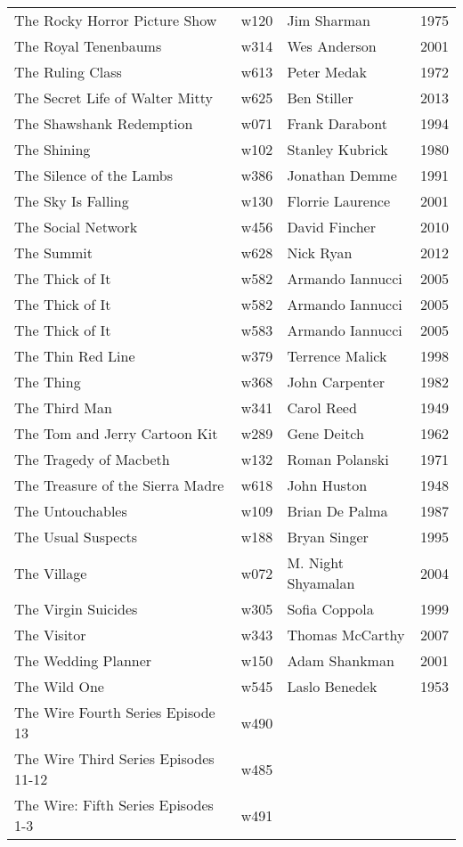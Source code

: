 \documentclass{article}
\begin{document}
\begin {center}
\begin{longtable}{p{10cm} l l l}
The Rocky Horror Picture Show & w120 & Jim Sharman & 1975 \\
The Royal Tenenbaums & w314 & Wes Anderson & 2001 \\
The Ruling Class & w613 & Peter Medak & 1972 \\
The Secret Life of Walter Mitty & w625 & Ben Stiller & 2013 \\
The Shawshank Redemption & w071 & Frank Darabont & 1994 \\
The Shining & w102 & Stanley Kubrick & 1980 \\
The Silence of the Lambs & w386 & Jonathan Demme & 1991 \\
The Sky Is Falling & w130 & Florrie Laurence & 2001 \\
The Social Network & w456 & David Fincher & 2010 \\
The Summit & w628 & Nick Ryan & 2012 \\
The Thick of It & w582 & Armando Iannucci & 2005 \\
The Thick of It & w582 & Armando Iannucci & 2005 \\
The Thick of It & w583 & Armando Iannucci & 2005 \\
The Thin Red Line & w379 & Terrence Malick & 1998 \\
The Thing & w368 & John Carpenter & 1982 \\
The Third Man & w341 & Carol Reed & 1949 \\
The Tom and Jerry Cartoon Kit & w289 & Gene Deitch & 1962 \\
The Tragedy of Macbeth & w132 & Roman Polanski & 1971 \\
The Treasure of the Sierra Madre & w618 & John Huston & 1948 \\
The Untouchables & w109 & Brian De Palma & 1987 \\
The Usual Suspects & w188 & Bryan Singer & 1995 \\
The Village & w072 & M. Night Shyamalan & 2004 \\
The Virgin Suicides & w305 & Sofia Coppola & 1999 \\
The Visitor & w343 & Thomas McCarthy & 2007 \\
The Wedding Planner & w150 & Adam Shankman & 2001 \\
The Wild One & w545 & Laslo Benedek & 1953 \\
The Wire Fourth Series Episode 13 & w490 &  &  \\
The Wire Third Series Episodes 11-12 & w485 &  &  \\
The Wire: Fifth Series Episodes 1-3 & w491 &  &  \\

\end{longtable}
\end{center}
\end{document}
